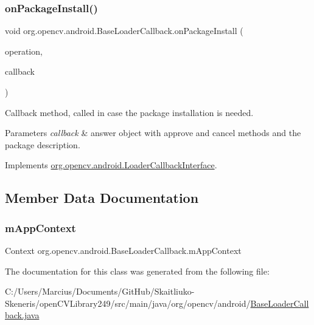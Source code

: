 \subsubsection{\texorpdfstring{on\+Package\+Install()}{onPackageInstall()}}
{\footnotesize\ttfamily void org.\+opencv.\+android.\+Base\+Loader\+Callback.\+on\+Package\+Install (\begin{DoxyParamCaption}\item[{final int}]{operation,  }\item[{final \mbox{\hyperlink{interfaceorg_1_1opencv_1_1android_1_1_install_callback_interface}{Install\+Callback\+Interface}}}]{callback }\end{DoxyParamCaption})}

Callback method, called in case the package installation is needed. 
\begin{DoxyParams}{Parameters}
{\em callback} & answer object with approve and cancel methods and the package description. \\
\hline
\end{DoxyParams}


Implements \mbox{\hyperlink{interfaceorg_1_1opencv_1_1android_1_1_loader_callback_interface_a996cd7844145b1e99ceeda27af9a6713}{org.\+opencv.\+android.\+Loader\+Callback\+Interface}}.



\subsection{Member Data Documentation}
\mbox{\label{classorg_1_1opencv_1_1android_1_1_base_loader_callback_aac85fd9df548c4e068f1480e7f33bbf8}} 
\subsubsection{\texorpdfstring{m\+App\+Context}{mAppContext}}
{\footnotesize\ttfamily Context org.\+opencv.\+android.\+Base\+Loader\+Callback.\+m\+App\+Context\hspace{0.3cm}{\ttfamily [protected]}}



The documentation for this class was generated from the following file\+:\begin{DoxyCompactItemize}
\item 
C\+:/\+Users/\+Marcius/\+Documents/\+Git\+Hub/\+Skaitliuko-\/\+Skeneris/open\+C\+V\+Library249/src/main/java/org/opencv/android/\mbox{\hyperlink{_base_loader_callback_8java}{Base\+Loader\+Callback.\+java}}\end{DoxyCompactItemize}
